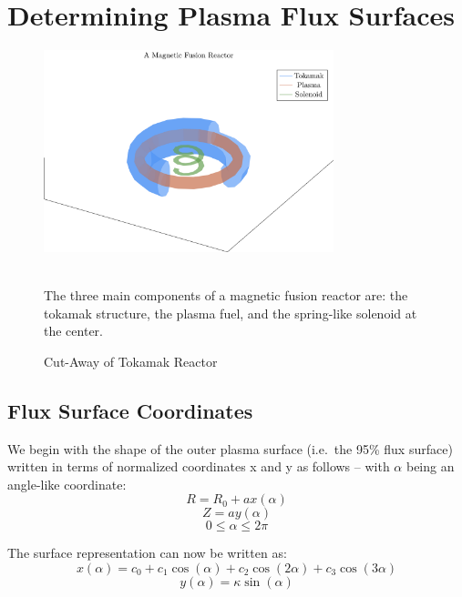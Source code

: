 \chapter{Determining Plasma Flux Surfaces}

\label{chapter:flux}

\begin{figure}[h]
	\centering
	\includegraphics[width=0.75\textwidth]{images/fusion_reactor}
	\caption{Cut-Away of Tokamak Reactor} ~\\
	\small The three main components of a magnetic fusion reactor are: the tokamak structure, the plasma fuel, and the spring-like solenoid at the center.
\end{figure}

\section{Flux Surface Coordinates}

We begin with the shape of the outer plasma surface (i.e.\ the 95\% flux surface) written in terms of normalized coordinates x and y as follows -- with $\alpha$ being an angle-like coordinate:
\begin{equation}
	R = R_0 + a x( \alpha )
\end{equation}
\begin{equation}
	Z = a y( \alpha )
\end{equation}
\begin{equation}
	0 \le \alpha \le 2 \pi
\end{equation}

The surface representation can now be written as:
\begin{equation}
	\label{eq:xalpha}
	x(\alpha) = c_0 + c_1 \cos(\alpha) + c_2 \cos(2\alpha) + c_3 \cos(3\alpha)
\end{equation}
\begin{equation}
	\label{eq:yalpha}
	y(\alpha) = \kappa \sin(\alpha)
\end{equation}

